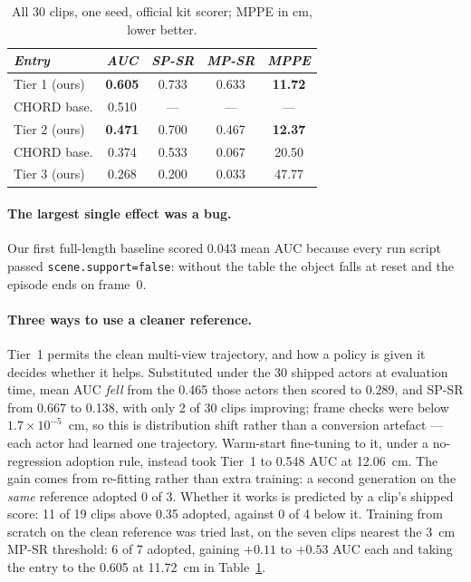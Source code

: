 \documentclass[10pt]{nvidiaextabstract}
\begin{document}
\begin{table}[t]
  \centering\footnotesize\setlength{\tabcolsep}{3.2pt}
  \begin{tabular}{lcccc}
    \toprule
    \textit{Entry} & \textit{AUC} & \textit{SP-SR} & \textit{MP-SR} & \textit{MPPE} \\
    \midrule
    Tier 1 (ours)   & \textbf{0.605} & 0.733 & 0.633 & \textbf{11.72} \\
    \;\; CHORD base. & 0.510 & --- & --- & --- \\
    Tier 2 (ours)   & \textbf{0.471} & 0.700 & 0.467 & \textbf{12.37} \\
    \;\; CHORD base. & 0.374 & 0.533 & 0.067 & 20.50 \\
    Tier 3 (ours)   & 0.268 & 0.200 & 0.033 & 47.77 \\
    \bottomrule
  \end{tabular}
  \caption{All 30 clips, one seed, official kit scorer; MPPE in cm, lower better.}
  \label{tab:results}
\end{table}

\paragraph{The largest single effect was a bug.} Our first full-length baseline scored 0.043 mean
AUC because every run script passed \texttt{scene.support=false}: without the table the object
falls at reset and the episode ends on frame~0.

\paragraph{Three ways to use a cleaner reference.} Tier~1 permits the clean multi-view
trajectory, and how a policy is given it decides whether it helps. Substituted under the 30
shipped actors at evaluation time, mean AUC \emph{fell} from the 0.465 those actors then scored
to 0.289, and SP-SR from 0.667 to 0.138, with only 2 of 30 clips improving; frame checks were below $1.7\times10^{-5}$~cm, so
this is distribution shift rather than a conversion artefact --- each actor had learned one
trajectory. Warm-start fine-tuning to it, under a no-regression adoption rule, instead took
Tier~1 to 0.548 AUC at 12.06~cm. The gain comes from re-fitting rather than extra training: a
second generation on the \emph{same} reference adopted 0 of 3. Whether it works is predicted by a clip's shipped
score: 11 of 19 clips above 0.35 adopted, against 0 of 4 below it. Training from scratch on the
clean reference was tried last, on the seven clips nearest the 3~cm MP-SR threshold: 6 of 7
adopted, gaining $+0.11$ to $+0.53$ AUC each and taking the entry to the 0.605 at 11.72~cm in
Table~\ref{tab:results}.
\end{document}
